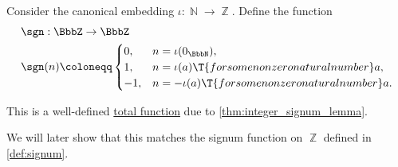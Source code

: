 \begin{definition}\label{def:integer_signum}\mimprovised
  Consider the canonical embedding \( \iota: \BbbN \to \BbbZ \). Define the  function
  \begin{equation*}
    \begin{aligned}
      &\sgn: \BbbZ \to \BbbZ \\
      &\sgn(n) \coloneqq \begin{cases}
        0,  &n = \iota(0_\BbbN), \\
        1,  &n = \iota(a) \T{for some nonzero natural number} a, \\
        -1, &n = -\iota(a) \T{for some nonzero natural number} a.
      \end{cases}
    \end{aligned}
  \end{equation*}

  This is a well-defined \hyperref[def:partial_function]{total function} due to \cref{thm:integer_signum_lemma}.
\end{definition}
\begin{comments}
  \item We will later show that this matches the signum function on \( \BbbZ \) defined in \cref{def:signum}.
\end{comments}

